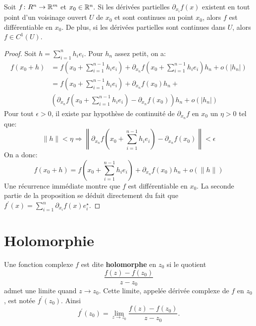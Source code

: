 \begin{fprop} Soit $f \colon R^n \to \mathbb R^m$ et $x_0 \in \mathbb R^n.$ Si les dérivées partielles $\partial_{x_i} f(x)$ existent en tout point
  d'un voisinage ouvert $U$ de $x_0$ et sont continues au point $x_0$,
    alors $f$ est différentiable en $x_0.$ De plus, si les dérivées partielles sont continues dans $U$, alors $f \in C^1(U).$
\end{fprop}
\begin{proof}
  Soit $h = \sum_{i=1}^n h_i e_i.$
Pour $h_n$ assez petit, on a:
\begin{align}
  f\left( x_0 + h \right) & = f\left( x_0 + \sum_{i=1}^{n-1} h_i e_i \right) + 
  \partial_{x_n}f\left( x_0 + \sum_{i=1}^{n-1} h_i e_i \right)h_n + o\left( |h_n| \right) \\
  & = f\left( x_0 + \sum_{i=1}^{n-1} h_i e_i \right) + 
  \partial_{x_n}f(x_0)h_n+ \\
  &  \left(\partial_{x_n}f\left( x_0 + \sum_{i=1}^{n-1} h_i e_i \right) - \partial_{x_n}f(x_0) \right)h_n + o\left( |h_n| \right) 
\end{align}
Pour tout $\epsilon > 0$, il existe par hypothèse de continuité de $\partial_{x_n}f$ en $x_0$ un $\eta > 0$ tel que:
\begin{equation}
  \|h\| < \eta \Rightarrow \left \| \partial_{x_n}f\left( x_0 + \sum_{i=1}^{n-1} h_i e_i \right) - \partial_{x_n}f(x_0) \right \| < \epsilon
\end{equation}
On a donc:
\begin{equation}
   f\left( x_0 + h \right)  = f\left( x_0 + \sum_{i=1}^{n-1} h_i e_i \right) + 
  \partial_{x_n}f\left( x_0 \right)h_n + o\left( \|h\| \right)
\end{equation}
Une récurrence immédiate montre que $f$ est différentiable en $x_0.$ La seconde partie de la proposition se déduit directement du fait
que $f^\prime(x) = \sum_{i=1}^n \partial_{x_i}f(x) e_i^\star.$
\end{proof}



\section{Holomorphie}
\begin{fdefn}
Une fonction complexe $f$ est dite \textbf{holomorphe} en $z_0$ si le quotient
\[\frac{f(z) - f(z_0)}{z - z_0}\]
admet une limite quand $z \rightarrow z_0$. Cette limite, appelée dérivée complexe de $f$ en $z_0$, est notée $f^\prime(z_0)$. Ainsi
\[f^\prime(z_0) = \lim_{z \rightarrow z_0}\frac{f(z) - f(z_0)}{z - z_0}.\]  
\end{fdefn}

